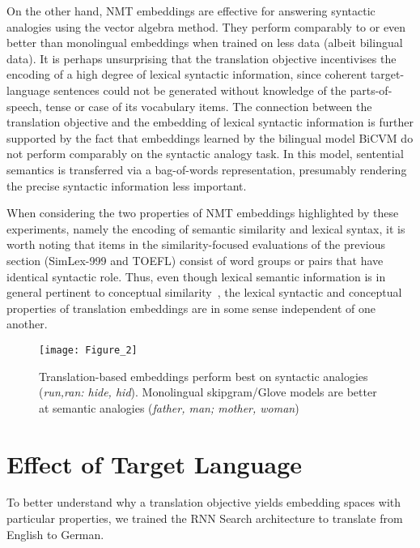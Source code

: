 \documentclass{article} %
\begin{document}
On the other hand, NMT embeddings are effective for answering syntactic analogies using the vector algebra method. They perform comparably to or even better than monolingual embeddings when trained on less data (albeit bilingual data). It is perhaps unsurprising that the translation objective incentivises the encoding of a high degree of lexical syntactic information, since coherent target-language sentences could not be generated without knowledge of the parts-of-speech, tense or case of its vocabulary items. The connection between the translation objective and the embedding of lexical syntactic information is further supported by the fact that embeddings learned by the bilingual model BiCVM do not perform comparably on the syntactic analogy task. In this model, sentential semantics is transferred via a bag-of-words representation, presumably rendering the precise syntactic information less important.

When considering the two properties of NMT embeddings highlighted by these experiments, namely the encoding of semantic similarity and lexical syntax, it is worth noting that items in the similarity-focused evaluations of the previous section (SimLex-999 and TOEFL) consist of word groups or pairs that have identical syntactic role. Thus, even though lexical semantic information is in general pertinent to conceptual similarity~\citep{levy2014dependency}, the lexical syntactic and conceptual properties of translation embeddings are in some sense independent of one another.  


\begin{figure*}[ht]

\texttt{[image: Figure\_2]}

\vspace{-4mm}
\caption{Translation-based embeddings perform best on syntactic analogies (\emph{run,ran: hide, hid}). Monolingual skipgram/Glove models are better at semantic analogies (\emph{father, man; mother, woman})}
\label{fig:analogy}

\end{figure*}

\section{Effect of Target Language}

To better understand why a translation objective yields embedding spaces with particular properties, we trained the RNN Search architecture to translate from English to German. 
\end{document}
